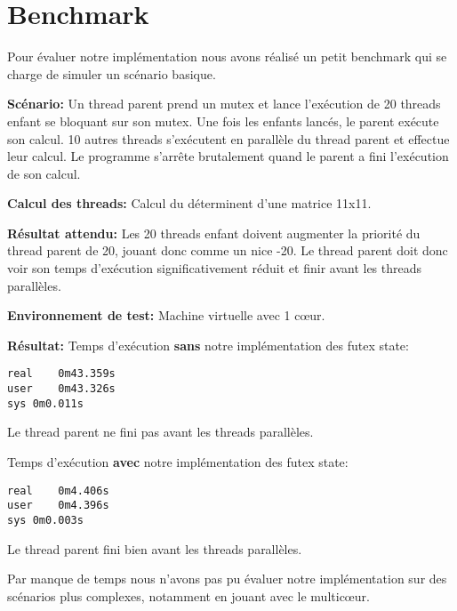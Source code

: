 \section{Benchmark}

Pour évaluer notre implémentation nous avons réalisé un petit benchmark qui se charge de simuler un
scénario basique.

\noindent \textbf{Scénario:}
Un thread parent prend un mutex et lance l'exécution de 20 threads enfant se bloquant sur son mutex.
Une fois les enfants lancés, le parent exécute son calcul.
10 autres threads s'exécutent en parallèle du thread parent et effectue leur calcul.
Le programme s'arrête brutalement quand le parent a fini l'exécution de son calcul.

\noindent \textbf{Calcul des threads:} 
Calcul du déterminent d'une matrice 11x11.

\noindent \textbf{Résultat attendu:}
Les 20 threads enfant doivent augmenter la priorité du thread parent de 20,
jouant donc comme un nice -20. Le thread parent doit donc voir son temps d'exécution significativement
réduit et finir avant les threads parallèles.

\noindent \textbf{Environnement de test:}
Machine virtuelle avec 1 cœur.

\noindent \textbf{Résultat:}
Temps d'exécution \textbf{sans} notre implémentation des futex state:
\begin{lstlisting}
real	0m43.359s
user	0m43.326s
sys	0m0.011s
\end{lstlisting}
Le thread parent ne fini pas avant les threads parallèles.

\noindent Temps d'exécution \textbf{avec} notre implémentation des futex state:
\begin{lstlisting}
real	0m4.406s
user	0m4.396s
sys	0m0.003s
\end{lstlisting}
Le thread parent fini bien avant les threads parallèles.

Par manque de temps nous n'avons pas pu évaluer notre implémentation sur des scénarios plus complexes,
notamment en jouant avec le multicœur. 
